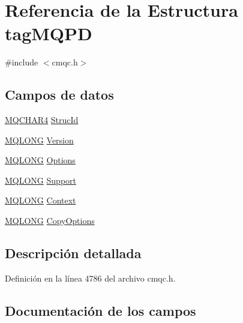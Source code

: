 \hypertarget{structtag_m_q_p_d}{}\section{Referencia de la Estructura tag\+M\+Q\+P\+D}
\label{structtag_m_q_p_d}


{\ttfamily \#include $<$cmqc.\+h$>$}

\subsection*{Campos de datos}
\begin{DoxyCompactItemize}
\item 
\hyperlink{cmqc_8h_a12590e546ed66fda7cf21c1d5cefa31d}{M\+Q\+C\+H\+A\+R4} \hyperlink{structtag_m_q_p_d_a0530922ca944569b52601d74941f96e4}{Struc\+Id}
\item 
\hyperlink{cmqc_8h_a1fb8d28cbda3fa8766a9821230cdb6d5}{M\+Q\+L\+O\+N\+G} \hyperlink{structtag_m_q_p_d_a0656ef8f766b3907d394d88a35d7b7e9}{Version}
\item 
\hyperlink{cmqc_8h_a1fb8d28cbda3fa8766a9821230cdb6d5}{M\+Q\+L\+O\+N\+G} \hyperlink{structtag_m_q_p_d_ad7aff2d6c6044809464380998d24ec5c}{Options}
\item 
\hyperlink{cmqc_8h_a1fb8d28cbda3fa8766a9821230cdb6d5}{M\+Q\+L\+O\+N\+G} \hyperlink{structtag_m_q_p_d_af5d5b2a40b10005006c5584e02c61796}{Support}
\item 
\hyperlink{cmqc_8h_a1fb8d28cbda3fa8766a9821230cdb6d5}{M\+Q\+L\+O\+N\+G} \hyperlink{structtag_m_q_p_d_ae02ee8a9bc114b5315e104f8b7d6249a}{Context}
\item 
\hyperlink{cmqc_8h_a1fb8d28cbda3fa8766a9821230cdb6d5}{M\+Q\+L\+O\+N\+G} \hyperlink{structtag_m_q_p_d_a64944f1782a83f9e73e9a7bdbd7b5544}{Copy\+Options}
\end{DoxyCompactItemize}


\subsection{Descripción detallada}


Definición en la línea 4786 del archivo cmqc.\+h.



\subsection{Documentación de los campos}
\hypertarget{structtag_m_q_p_d_ae02ee8a9bc114b5315e104f8b7d6249a}{}

